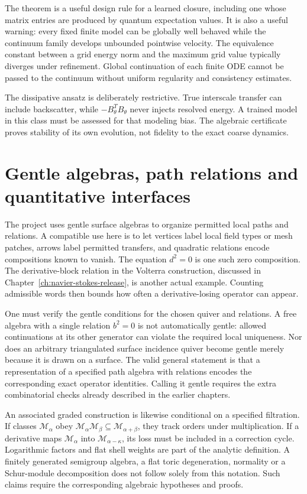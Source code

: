 The theorem is a useful design rule for a learned closure, including one whose matrix entries are produced by quantum expectation values. It is also a useful warning: every fixed finite model can be globally well behaved while the continuum family develops unbounded pointwise velocity. The equivalence constant between a grid energy norm and the maximum grid value typically diverges under refinement. Global continuation of each finite ODE cannot be passed to the continuum without uniform regularity and consistency estimates.

The dissipative ansatz is deliberately restrictive. True interscale transfer can include backscatter, while $-B_\theta^TB_\theta$ never injects resolved energy. A trained model in this class must be assessed for that modeling bias. The algebraic certificate proves stability of its own evolution, not fidelity to the exact coarse dynamics.

\section{Gentle algebras, path relations and quantitative interfaces}

The project uses gentle surface algebras to organize permitted local paths and relations. A compatible use here is to let vertices label local field types or mesh patches, arrows label permitted transfers, and quadratic relations encode compositions known to vanish. The equation $d^2=0$ is one such zero composition. The derivative-block relation in the Volterra construction, discussed in Chapter~\ref{ch:navier-stokes-release}, is another actual example. Counting admissible words then bounds how often a derivative-losing operator can appear.

One must verify the gentle conditions for the chosen quiver and relations. A free algebra with a single relation $b^2=0$ is not automatically gentle: allowed continuations at its other generator can violate the required local uniqueness. Nor does an arbitrary triangulated surface incidence quiver become gentle merely because it is drawn on a surface. The valid general statement is that a representation of a specified path algebra with relations encodes the corresponding exact operator identities. Calling it gentle requires the extra combinatorial checks already described in the earlier chapters.

An associated graded construction is likewise conditional on a specified filtration. If classes $\mathcal M_\alpha$ obey
$\mathcal M_\alpha\mathcal M_\beta\subseteq\mathcal M_{\alpha+\beta}$,
they track orders under multiplication. If a derivative maps $\mathcal M_\alpha$ into $\mathcal M_{\alpha-\kappa}$, its loss must be included in a correction cycle. Logarithmic factors and flat shell weights are part of the analytic definition. A finitely generated semigroup algebra, a flat toric degeneration, normality or a Schur-module decomposition does not follow solely from this notation. Such claims require the corresponding algebraic hypotheses and proofs.

